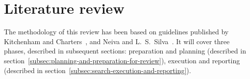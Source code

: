 \section{Literature review}\label{sec:literature-review}

The methodology of this review has been based on guidelines published by Kitchenham and Charters~\cite{kitchenham_guidelines_2007}, and Neiva and L.~S.~Silva~\cite{neiva_systematic_2016}.
It will cover three phases, described in subsequent sections: preparation and planning (described in section~\ref{subsec:planning-and-preparation-for-review}), execution and reporting (described in section~\ref{subsec:search-execution-and-reporting}).






